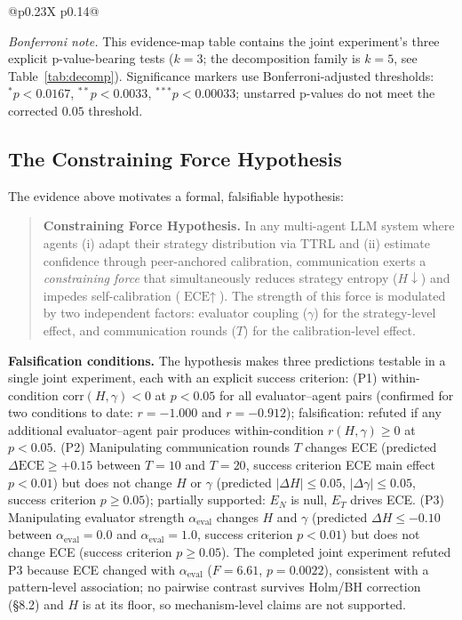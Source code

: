 \documentclass[11pt]{article}
\begin{document}
\begin{table}[t]
\begin{tabularx}{\textwidth}{@{}p{0.23\textwidth}X p{0.14\textwidth}@{}}
\bottomrule
\end{tabularx}
\vspace{0.35em}
\begin{minipage}{0.95\linewidth}
\footnotesize\emph{Bonferroni note.} This evidence-map table contains the joint experiment's three explicit p-value-bearing tests ($k=3$; the decomposition family is $k{=}5$, see Table~\ref{tab:decomp}). Significance markers use Bonferroni-adjusted thresholds: $^{*}p<0.0167$, $^{**}p<0.0033$, $^{***}p<0.00033$; unstarred p-values do not meet the corrected $0.05$ threshold.
\end{minipage}
\end{table}

\subsection{The Constraining Force Hypothesis}

The evidence above motivates a formal, falsifiable hypothesis:

\begin{quote}
\textbf{Constraining Force Hypothesis.} In any multi-agent LLM system where agents (i) adapt their strategy distribution via TTRL and (ii) estimate confidence through peer-anchored calibration, communication exerts a \textit{constraining force} that simultaneously reduces strategy entropy ($H \downarrow$) and impedes self-calibration ($\text{ECE} \uparrow$). The strength of this force is modulated by two independent factors: evaluator coupling ($\gamma$) for the strategy-level effect, and communication rounds ($T$) for the calibration-level effect.
\end{quote}

\textbf{Falsification conditions.} The hypothesis makes three predictions testable in a single joint experiment, each with an explicit success criterion: (P1) within-condition $\text{corr}(H, \gamma) < 0$ at $p < 0.05$ for all evaluator--agent pairs (confirmed for two conditions to date: $r = -1.000$ and $r = -0.912$); falsification: refuted if any additional evaluator--agent pair produces within-condition $r(H, \gamma) \geq 0$ at $p < 0.05$. (P2) Manipulating communication rounds $T$ changes ECE (predicted $\Delta\text{ECE} \geq +0.15$ between $T = 10$ and $T = 20$, success criterion ECE main effect $p < 0.01$) but does not change $H$ or $\gamma$ (predicted $|\Delta H| \leq 0.05$, $|\Delta\gamma| \leq 0.05$, success criterion $p \geq 0.05$); partially supported: $E_N$ is null, $E_T$ drives ECE. (P3) Manipulating evaluator strength $\alpha_{\text{eval}}$ changes $H$ and $\gamma$ (predicted $\Delta H \leq -0.10$ between $\alpha_{\text{eval}} = 0.0$ and $\alpha_{\text{eval}} = 1.0$, success criterion $p < 0.01$) but does not change ECE (success criterion $p \geq 0.05$). The completed joint experiment refuted P3 because ECE changed with $\alpha_{\text{eval}}$ ($F = 6.61$, $p = 0.0022$), consistent with a pattern-level association; no pairwise contrast survives Holm/BH correction (§8.2) and $H$ is at its floor, so mechanism-level claims are not supported.
\end{document}
